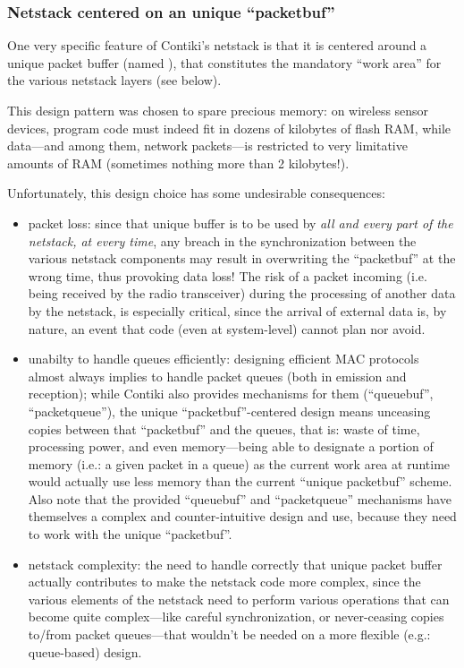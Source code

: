 \documentclass[12pt,a4paper]{article}
\begin{document}

\subsubsection{Netstack centered on an unique ``packetbuf''}

One very specific feature of Contiki's netstack is that it is centered
around a unique packet buffer (named ), that constitutes
the mandatory ``work area'' for the various netstack layers (see below).

This design pattern was chosen to spare precious memory: on wireless sensor
devices, program code must indeed fit in dozens of kilobytes of flash RAM,
while data---and among them, network packets---is restricted to very
limitative amounts of RAM (sometimes nothing more than 2 kilobytes!).

Unfortunately, this design choice has some undesirable consequences:
\begin{itemize}
\item packet loss: since that unique buffer is to be used by \emph{all
      and every part of the netstack, at every time}, any breach in
      the synchronization between the various netstack components
      may result in overwriting the ``packetbuf'' at the wrong time,
      thus provoking data loss! The risk of a packet incoming (i.e. being
      received by the radio transceiver) during the processing of another
      data by the netstack, is especially critical, since the arrival of
      external data is, by nature, an event that code (even at
      system-level) cannot plan nor avoid.
\item unabilty to handle queues efficiently: designing efficient MAC protocols
      almost always implies to handle packet queues (both in emission and
      reception); while Contiki also provides mechanisms for them
      (``queuebuf'', ``packetqueue''), the unique ``packetbuf''-centered
      design means unceasing copies between that ``packetbuf'' and the queues,
      that is: waste of time, processing power, and even memory---being
      able to designate a portion of memory (i.e.: a given packet in a
      queue) as the current work area at runtime would actually use less
      memory than the current ``unique packetbuf'' scheme. Also note that
      the provided ``queuebuf'' and ``packetqueue'' mechanisms have themselves
      a complex and counter-intuitive design and use, because they need to
      work with the unique ``packetbuf''.
\item netstack complexity: the need to handle correctly that unique packet
      buffer actually contributes to make the netstack code more complex,
      since the various elements of the netstack need to perform various
      operations that can become quite complex---like careful synchronization,
      or never-ceasing copies to/from packet queues---that wouldn't be
      needed on a more flexible (e.g.: queue-based) design.
\end{itemize}
\end{document}
